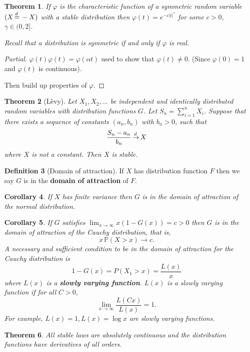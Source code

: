 \documentclass[10pt, oneside, reqno]{amsart}
\theoremstyle{plain}%
\newtheorem{thm}{Theorem}[section]
\newtheorem{cor}[thm]{Corollary}
\theoremstyle{definition}
\newtheorem{defn}[thm]{Definition}
\theoremstyle{remark}
\renewcommand{\phi}{\varphi}
\renewcommand{\P}{\mathbb{P}}
\def\cid{\,{\buildrel \!d \over \rightarrow}\,}
\def\eqd{\,{\buildrel \!d \over =}\,}
\begin{document}
\begin{thm}
    If $\phi$ is the characteristic function of a symmetric random variable $(X \eqd -X)$ with a stable distribution then $\phi(t) = e^{-c|t|^\gamma}$ for some $c > 0$, $\gamma \in (0, 2]$.  
    
    Recall that a distribution is symmetric if and only if $\phi$ is real.
\end{thm}
\begin{proof}[Partial]
    $\phi(t) \phi(t) = \phi(\alpha t)$ used to show that $\phi(t) \neq 0$.  (Since $\phi(0) = 1$ and $\phi(t)$ is continuous).
    
    Then build up properties of $\phi$.
\end{proof}

\begin{thm}[L\`evy]
    Let $X_1, X_2, \dots$ be independent and identically distributed random variables with distribution functions $G$.  Let $S_n = \sum_{i = 1}^n X_i$.  
    Suppose that there exists a sequence of constants $(a_n, b_n)$ with $b_n > 0$, such that \[
        \frac{S_n - a_n}{b_n} \cid X
    \] where $X$ is not a constant.   Then $X$ is stable.
\end{thm}

\begin{defn}[Domain of attraction]
    If $X$ has distribution function $F$ then we say $G$ is in the \textbf{domain of attraction} of $F$.    
\end{defn}
\begin{cor}
    If $X$ has finite variance then $G$ is in the domain of attraction of the normal distribution.  
\end{cor}

\begin{cor}
    If $G$ satisfies $\lim_{x \rightarrow \infty} x(1 - G(x)) = c > 0$ then $G$ is in the domain of attraction of the Cauchy distribution, that is, \[
        x\,\P(X > x) \rightarrow c.
    \]  A necessary and sufficient condition to be in the domain of attraction for the Cauchy distribution is \[
        1 - G(x) = P(X_1 > x) = \frac{L(x)}{x}
    \] where $L(x)$ is a \textbf{slowly varying function}.  $L(x)$ is a slowly varying function if for all $C > 0$, \[
        \lim_{x \rightarrow \infty} \frac{L(C x)}{L(x)} = 1.
    \]  For example, $L(x) = 1, L(x) = \log x$ are slowly varying functions.
\end{cor}

\begin{thm}
    All stable laws are absolutely continuous and the distribution functions have derivatives of all orders.
\end{thm}
\end{document}
